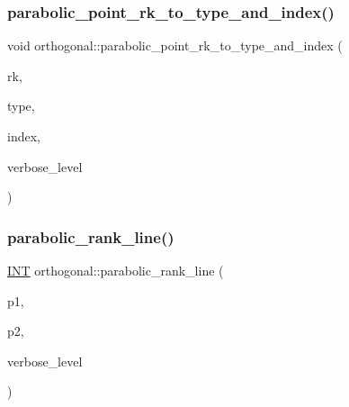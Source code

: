 \subsubsection{\texorpdfstring{parabolic\+\_\+point\+\_\+rk\+\_\+to\+\_\+type\+\_\+and\+\_\+index()}{parabolic\_point\_rk\_to\_type\_and\_index()}}
{\footnotesize\ttfamily void orthogonal\+::parabolic\+\_\+point\+\_\+rk\+\_\+to\+\_\+type\+\_\+and\+\_\+index (\begin{DoxyParamCaption}\item[{\mbox{\hyperlink{galois_8h_a09fddde158a3a20bd2dcadb609de11dc}{I\+NT}}}]{rk,  }\item[{\mbox{\hyperlink{galois_8h_a09fddde158a3a20bd2dcadb609de11dc}{I\+NT}} \&}]{type,  }\item[{\mbox{\hyperlink{galois_8h_a09fddde158a3a20bd2dcadb609de11dc}{I\+NT}} \&}]{index,  }\item[{\mbox{\hyperlink{galois_8h_a09fddde158a3a20bd2dcadb609de11dc}{I\+NT}}}]{verbose\+\_\+level }\end{DoxyParamCaption})}

\mbox{\label{classorthogonal_a7df334ceca90bc5b90c56354dbaf45c9}} 
\subsubsection{\texorpdfstring{parabolic\+\_\+rank\+\_\+line()}{parabolic\_rank\_line()}}
{\footnotesize\ttfamily \mbox{\hyperlink{galois_8h_a09fddde158a3a20bd2dcadb609de11dc}{I\+NT}} orthogonal\+::parabolic\+\_\+rank\+\_\+line (\begin{DoxyParamCaption}\item[{\mbox{\hyperlink{galois_8h_a09fddde158a3a20bd2dcadb609de11dc}{I\+NT}}}]{p1,  }\item[{\mbox{\hyperlink{galois_8h_a09fddde158a3a20bd2dcadb609de11dc}{I\+NT}}}]{p2,  }\item[{\mbox{\hyperlink{galois_8h_a09fddde158a3a20bd2dcadb609de11dc}{I\+NT}}}]{verbose\+\_\+level }\end{DoxyParamCaption})}

\mbox{\label{classorthogonal_a7f055ba3f318499430444e583ed03ee3}} 

